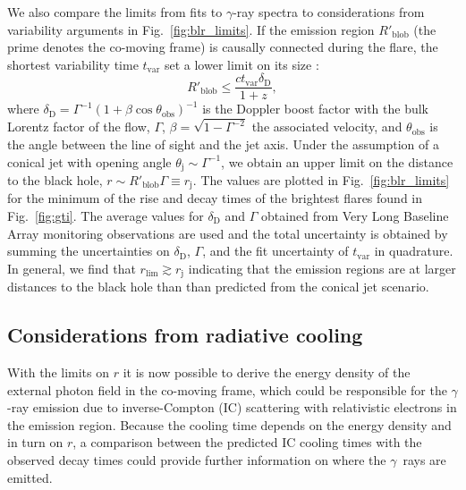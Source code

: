 \documentclass[twocolumn,linenumbers]{aastex62}
\newcommand{\Grays}{$\gamma$~rays\xspace}
\newcommand{\gray}{$\gamma$-ray\xspace}
\begin{document}
We also compare the limits from fits to \gray spectra to considerations from variability arguments in Fig.~\ref{fig:blr_limits}.
If the emission region $R'_\mathrm{blob}$ (the prime denotes the co-moving frame) is causally connected during the flare, the shortest variability time $t_\mathrm{var}$ set a lower limit on its size \citep[e.g.,][]{2008MNRAS.384L..19B}:
\begin{equation}
    R'_\mathrm{blob} \leqslant \frac{ct_\mathrm{var}\delta_\mathrm{D}}{1+z},  
\end{equation}
where $\delta_\mathrm{D} = \Gamma^{-1}(1 + \beta\cos\theta_\mathrm{obs})^{-1}$ is the Doppler boost factor with the bulk Lorentz factor of the flow, $\Gamma$, $\beta = \sqrt{1 - \Gamma^{-2}}$ the associated velocity, and $\theta_\mathrm{obs} $ is the angle between the line of sight and the jet axis.
Under the assumption of a conical jet with opening angle $\theta_\mathrm{j} \sim \Gamma^{-1}$, we obtain an upper limit on the distance to the black hole, $r \sim R'_\mathrm{blob}\Gamma \equiv r_\mathrm{j}$.
The values are plotted in Fig.~\ref{fig:blr_limits} for the minimum of the rise and decay times of the brightest flares found in Fig.~\ref{fig:gti}.
The average values for $\delta_\mathrm{D}$ and $\Gamma$ obtained from Very Long Baseline Array monitoring observations are used \citep{2017ApJ...846...98J}  and the total  uncertainty is obtained by summing the uncertainties on $\delta_\mathrm{D}$, $\Gamma$, and the fit uncertainty of $t_\mathrm{var}$ in quadrature.
In general, we find that $r_\mathrm{lim} \gtrsim r_\mathrm{j}$ indicating that the emission regions are at larger distances to the black hole than than predicted from the conical jet scenario.  

\subsection{Considerations from radiative cooling}
\label{sec:tcool}


With the limits on $r$ it is now possible to derive the energy density of the external photon field in the co-moving frame, which could be responsible for the \gray emission due to inverse-Compton (IC) scattering with relativistic electrons in the emission region. 
Because the cooling time depends on the energy density and in turn on $r$, a comparison between the predicted IC cooling times with the observed decay times could provide further information on where the \Grays are emitted.
\end{document}
